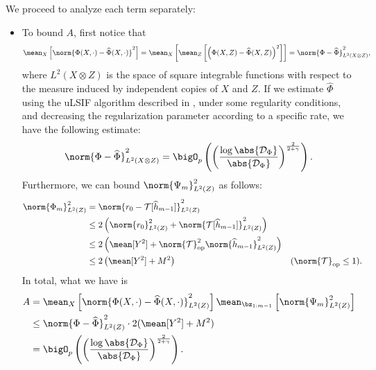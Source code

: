 We proceed to analyze each term separately:
\begin{itemize}
    \item To bound $ A $, first notice that
        \begin{align*}
            \mean_{ X } \left[
                \norm{ \Phi ( X, \cdot ) - \hat{ \Phi } ( X, \cdot ) }^2
            \right]
            = \mean_{ X } \left[
                \mean_{ Z } \left[
                    \left(
                        \Phi ( X, Z ) - \hat{ \Phi } ( X, Z )
                    \right)^2
                \right]
            \right]
            = \norm{ \Phi - \hat{ \Phi } }_{ L^2 ( X \otimes Z ) }^2
        ,\end{align*}
        where $ L^2 ( X \otimes Z ) $ is the space of square integrable functions with respect to the measure induced by independent copies of $ X $ and $ Z $.
        If we estimate $ \hat{ \Phi } $ using the uLSIF algorithm described in \cite{sugiyama2012}, under some regularity conditions, and decreasing the regularization parameter according to a specific rate, we have the following estimate: 
        \begin{equation*}
            \norm{ \Phi - \hat{ \Phi } }^2_{ L^2 ( X \otimes Z ) }
            = \bigO_{ p } \left(
                \left(
                    \frac{ \log \abs{ \data_{ \Phi } } }{ \abs{ \data_{ \Phi } } }
                \right)^{ \frac{ 2 }{ 2 + \gamma } }
            \right)
        .\end{equation*}
    Furthermore, we can bound $ \norm{ \Psi_{ m } }_{ L^2 ( Z ) }^2 $ as follows:
    \begin{align*}
        \norm{ \Phi_{ m } }_{ L^2 ( Z ) }^2
        &= \norm{ r_{ 0 } - \mathcal{T} [ \hat{ h }_{ m-1 } ] }_{ L^2 ( Z ) }^2 \\
        &\leq 2 \left(
            \norm{ r_{ 0 } }_{ L^{ 2 } ( Z ) }^2
            + \norm{ \mathcal{T} [ \hat{ h }_{ m-1 } ] }_{ L^{ 2 } ( Z ) }^2
        \right) \\
        &\leq 2 \left(
            \mean [ Y^2 ] + \norm{ \mathcal{T} }_{ \mathrm{op} }^2 \norm{ \hat{ h }_{ m-1 } }_{ L^{ 2 } ( Z ) }^2
        \right) \\
        &\leq 2 \left(
            \mean [ Y^2 ] + M^2
        \right)
        &&( \norm{ \mathcal{T} }_{ \mathrm{op} } \leq 1 )
    .\end{align*}
    In total, what we have is
    \begin{align*}
        A &= \mean_{ X } \left[
            \norm{ \Phi ( X, \cdot ) - \hat{ \Phi } ( X, \cdot ) }_{ L^{ 2 } ( Z ) }^2
        \right]
        \mean_{ \bz_{ 1:m-1 } } \left[
            \norm{ \Psi_{ m } }_{ L^{ 2 } ( Z ) }^2
        \right] \\
        &\leq \norm{ \Phi - \hat{ \Phi } }_{ L^{ 2 } ( Z ) }^2
        \cdot 2 ( \mean [ Y^2 ] + M^2 ) \\
        &= \bigO_{ p } \left(
            \left(
                \frac{ \log \abs{ \data_{ \Phi } } }{ \abs{ \data_{ \Phi } } }
            \right)^{ \frac{ 2 }{ 2 + \gamma } }
        \right)
    .\end{align*}


\end{itemize}
